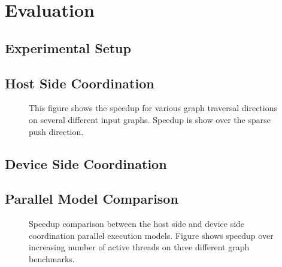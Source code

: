 
\section{Evaluation} \label{sec:eval}

\subsection{Experimental Setup}

\subsection{Host Side Coordination}

\begin{figure}[t]
	\centering
	\caption{This figure shows the speedup for various graph traversal directions on several different input graphs. Speedup is show over the sparse push direction.}
	\label{fig:direction-plot}
\end{figure}

\subsection{Device Side Coordination}

\subsection{Parallel Model Comparison}

\begin{figure*}[t]
	\centering
	\label{speedup-methods}
    \caption{Speedup comparison between the host side and device side coordination parallel execution models. Figure shows speedup over increasing number of active threads on three different graph benchmarks.}
\end{figure*}

